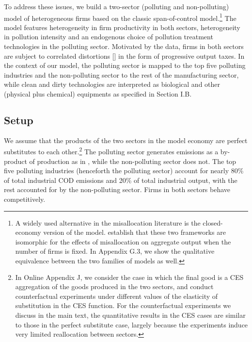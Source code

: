 \documentclass[AEJ]{AEA}
\begin{document}
To address these issues, we build a two-sector (polluting and non-polluting) model of heterogeneous firms based on the classic \citet{Lucas:1978b} span-of-control model.\footnote{A widely used alternative  in the misallocation literature is the closed-economy version of the \citet{Melitz:2003} model. \citet{HsiehKlenow:2009} establish that these two frameworks are isomorphic for the effects of misallocation on aggregate output when the number of firms is fixed. In Appendix G.3, we show the qualitative equivalence between the two families of models as well.} The model features heterogeneity in firm productivity in both sectors, heterogeneity in pollution intensity and an endogenous choice of pollution treatment technologies in the polluting sector. Motivated by the data, firms in both sectors are subject to correlated distortions [\citet{RestucciaRogerson:2008}] in the form of progressive output taxes. %
In the context of our model, the polluting sector is mapped to the top five polluting industries and the non-polluting sector to the rest of the manufacturing sector, while clean and dirty technologies are interpreted as biological and other (physical plus chemical) equipments as specified in Section I.B.

\subsection{Setup}

We assume that the products of the two sectors in the model economy are perfect substitutes to each other.\footnote{In Online Appendix J, we consider the case in which the final good is a CES aggregation of the goods produced in the two sectors, and conduct counterfactual experiments under different values of the elasticity of substitution in the CES function. For the counterfactual experiments we discuss in the main text, the quantitative results in the CES cases are similar to those in the perfect substitute case, largely because the experiments induce very limited reallocation between sectors.} The polluting sector generates emissions as a by-product of production as in \citet{CopelandTaylor:1994}, while the non-polluting sector does not. The top five polluting industries (henceforth the polluting sector) account for nearly 80\% of total industrial COD emissions and 20\% of total industrial output, with the rest accounted for by the non-polluting sector. Firms in both sectors behave competitively.
\end{document}
